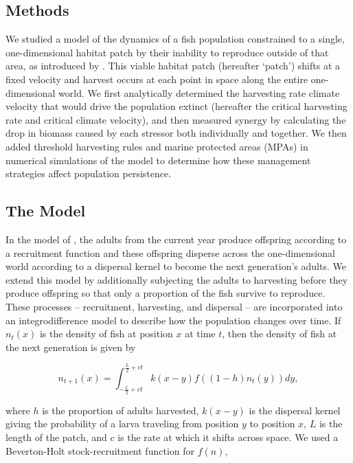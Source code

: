 \documentclass[12pt,english]{article}
\begin{document}
\begin{spacing}{1.9}
\begin{flushleft}
\section{Methods}

We studied a model of the dynamics of a fish population constrained to a single, one-dimensional habitat patch by their inability to reproduce outside of that area, as introduced by \cite{ZhouKot2011}. This viable habitat patch (hereafter `patch') shifts at a fixed velocity and harvest occurs at each point in space along the entire one-dimensional world.  We first analytically determined the harvesting rate climate velocity that would drive the population extinct (hereafter the critical harvesting rate and critical climate velocity), and then measured synergy by calculating the drop in biomass caused by each stressor both individually and together. We then added threshold harvesting rules and marine protected areas (MPAs) in numerical simulations of the model to determine how these management strategies affect population persistence.

\subsection{The Model }

In the model of \cite{ZhouKot2011}, the adults from the current year produce offspring according to a recruitment function and these offspring disperse across the one-dimensional world according to a dispersal kernel to become the next generation's adults.  We extend this model by additionally subjecting the adults to harvesting before they produce offspring so that only a proportion of the fish survive to reproduce. These processes -- recruitment, harvesting, and dispersal -- are incorporated into an integrodifference model to describe how the population changes over time. If $n_t(x)$ 
is the density of fish at position $x$ at time $t$, then the density of fish at the next generation is given by

\begin{equation*}
n_{t+1}(x)=\int^{\frac{L}{2}+ct}_{-\frac{L}{2}+ct}k(x-y)f((1-h)n_t(y))dy \label{integrodifference},
\end{equation*}

\noindent where $h$ is the proportion of adults harvested, $k(x-y)$ is the dispersal kernel giving the probability of a  larva traveling from position $y$ to position $x$, $L$ is the length of the patch, and $c$ is the rate at which it  shifts across space. We used a Beverton-Holt stock-recruitment function for $f(n)$,


\end{flushleft}
\end{spacing}
\end{document}
